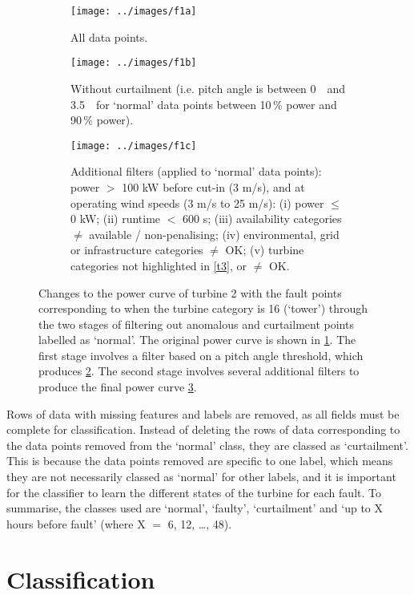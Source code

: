\begin{figure}
  \centering
  \begin{subfigure}[t]{.5\textwidth}
    \centering
    \texttt{[image: ../images/f1a]}
    \caption{\label{f1a}All data points.}
  \end{subfigure}%
  \begin{subfigure}[t]{.5\textwidth}
    \centering
    \texttt{[image: ../images/f1b]}
    \caption{\label{f1b}Without curtailment (i.e. pitch angle is between 0\,\textdegree~ and 3.5\,\textdegree~ for `normal' data points between 10\,\% power and 90\,\% power).}
  \end{subfigure}
  \begin{subfigure}[t]{.5\textwidth}
    \centering
    \texttt{[image: ../images/f1c]}
    \caption{\label{f1c}
      Additional filters (applied to `normal' data points): power $>$ 100 kW before cut-in (3 m/s), and at operating wind speeds (3 m/s to 25 m/s): (i) power $\leq$ 0 kW; (ii) runtime $<$ 600 s; (iii) availability categories $\neq$ available / non-penalising; (iv) environmental, grid or infrastructure categories $\neq$ OK; (v) turbine categories not highlighted in \autoref{t3}, or $\neq$ OK.
    }
  \end{subfigure}
  \caption{\label{f1}Changes to the power curve of turbine 2 with the fault points corresponding to when the turbine category is 16 (`tower') through the two stages of filtering out anomalous and curtailment points labelled as `normal'. The original power curve is shown in \ref{f1a}. The first stage involves a filter based on a pitch angle threshold, which produces \ref{f1b}. The second stage involves several additional filters to produce the final power curve \ref{f1c}.}
\end{figure}

Rows of data with missing features and labels are removed, as all fields must be complete for classification. Instead of deleting the rows of data corresponding to the data points removed from the `normal' class, they are classed as `curtailment'. This is because the data points removed are specific to one label, which means they are not necessarily classed as `normal' for other labels, and it is important for the classifier to learn the different states of the turbine for each fault. To summarise, the classes used are `normal', `faulty', `curtailment' and `up to X hours before fault' (where X $=$ 6, 12, \dots, 48). 

\section{Classification}

